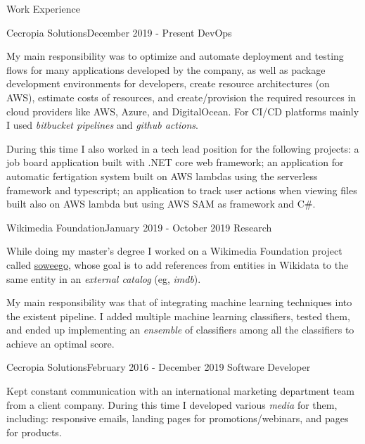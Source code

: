 \documentclass{resume} %
\begin{document}
\begin{rSection}{Work Experience}


\begin{rSubsection}{Cecropia Solutions}{December 2019 - Present}
{DevOps}{}
\item[] My main responsibility was to optimize and automate deployment and testing flows for many applications developed by the company, as well as package development environments for developers, create resource architectures (on AWS), estimate costs of resources, and create/provision the required resources in cloud providers like AWS, Azure, and DigitalOcean. For CI/CD platforms mainly I used \textit{bitbucket pipelines} and \textit{github actions}. 

During this time I also worked in a tech lead position for the following projects: a job board application built with .NET core web framework; an application for automatic fertigation system built on AWS lambdas using the serverless framework and typescript; an application to track user actions when viewing files built also on AWS lambda but using AWS SAM as framework and C\#. 
\end{rSubsection}

\begin{rSubsection}{Wikimedia Foundation}{January 2019 - October 2019}
{Research}{}
\item[] While doing my master's degree I worked on a Wikimedia Foundation project called \href{https://meta.wikimedia.org/wiki/Grants:Project/Hjfocs/soweego}{soweego}, whose goal is to add references from entities in Wikidata to the same entity in an \textit{external catalog} (eg, \textit{imdb}).

My main responsibility was that of integrating machine learning techniques into the existent pipeline. I added multiple machine learning classifiers, tested them, and ended up implementing an \textit{ensemble} of classifiers among all the classifiers to achieve an optimal score.
\end{rSubsection}

\begin{rSubsection}{Cecropia Solutions}{February 2016 - December 2019}
{Software Developer}{}
\item[] Kept constant communication with an international marketing department team from a client company. During this time I developed various \textit{media} for them, including: responsive emails, landing pages for promotions/webinars, and pages for products. 


\end{rSubsection}
\end{rSection}
\end{document}
